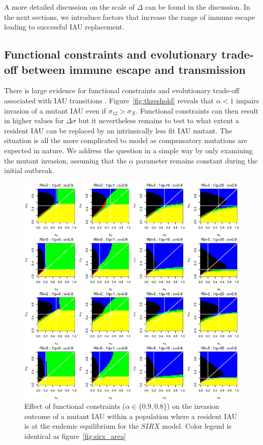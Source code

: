 A more detailed discussion on the scale of $\Delta$ can be found in
the discussion. In the next sections, we introduce factors that
increase the range of immune escape leading to successful IAU
replacement.


\subsection{Functional constraints and evolutionary trade-off between
  immune escape and transmission}

There is large evidence for functional constraints and evolutionary
trade-off associated with IAU transitions \citep{Rambaut2008}.
Figure~\ref{fig:threshold} reveals that $\alpha<1$ impairs invasion of
a mutant IAU even if $\sigma_{12}>\sigma_{X}$. Functional constraints
can then result in higher values for $\Delta\sigma$ but it
nevertheless remains to test to what extent a resident IAU can be
replaced by an intrinsically less fit IAU mutant. The situation is all
the more complicated to model as compensatory mutations are expected
in nature. We address the question in a simple way by only examining
the mutant invasion, assuming that the $\alpha$ parameter remains
constant during the initial outbreak.

\begin{figure}[!htbp]
  \center
  \includegraphics[width=0.8\linewidth]{texte/article3/graph/sirx_trade_off_short.eps}
  \caption{Effect of functional constraints ($\alpha\in\{0.9,0.8\}$)
    on the invasion outcome of a mutant IAU within a population where
    a resident IAU is at the endemic equilibrium for the $SIRX$ model.
    Color legend is identical as figure~\ref{fig:sirx_area}}
  \label{fig:sirx_trade_off_09}
\end{figure}

